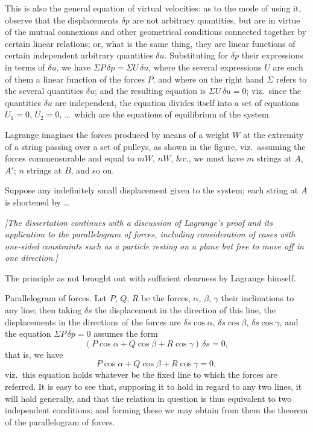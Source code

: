 \documentclass[11pt,a4paper]{book}
\begin{document}
This is also the general equation of virtual velocities: as to the mode of using it, observe that the displacements $\delta p$ are not arbitrary quantities, but are in virtue of the mutual connexions and other geometrical conditions connected together by certain linear relations; or, what is the same thing, they are linear functions of certain independent arbitrary quantities $\delta u$. Substituting for $\delta p$ their expressions in terms of $\delta u$, we have $\Sigma P\,\delta p = \Sigma U\,\delta u$, where the several expressions $U$ are each of them a linear function of the forces $P$, and where on the right hand $\Sigma$ refers to the several quantities $\delta u$; and the resulting equation is $\Sigma U\,\delta u = 0$; viz.\ since the quantities $\delta u$ are independent, the equation divides itself into a set of equations $U_1 = 0$, $U_2 = 0$, \ldots\ which are the equations of equilibrium of the system.

Lagrange imagines the forces produced by means of a weight $W$ at the extremity of a string passing over a set of pulleys, as shown in the figure, viz.\ assuming the forces commensurable and equal to $mW$, $nW$, \&c., we must have $m$ strings at $A$, $A'$; $n$ strings at $B$, and so on.

Suppose any indefinitely small displacement given to the system; each string at $A$ is shortened by \ldots

\smallskip

\textit{[The dissertation continues with a discussion of Lagrange's proof and its application to the parallelogram of forces, including consideration of cases with one-sided constraints such as a particle resting on a plane but free to move off in one direction.]}

\smallskip

The principle as not brought out with sufficient clearness by Lagrange himself.

\smallskip

Parallelogram of forces. Let $P$, $Q$, $R$ be the forces, $\alpha$, $\beta$, $\gamma$ their inclinations to any line; then taking $\delta s$ the displacement in the direction of this line, the displacements in the directions of the forces are $\delta s \cos \alpha$, $\delta s \cos \beta$, $\delta s \cos \gamma$, and the equation $\Sigma P\,\delta p = 0$ assumes the form
\[
(P \cos \alpha + Q \cos \beta + R \cos \gamma)\, \delta s = 0,
\]
that is, we have
\[
P \cos \alpha + Q \cos \beta + R \cos \gamma = 0,
\]
viz.\ this equation holds whatever be the fixed line to which the forces are referred. It is easy to see that, supposing it to hold in regard to any two lines, it will hold generally, and that the relation in question is thus equivalent to two independent conditions; and forming these we may obtain from them the theorem of the parallelogram of forces.
\end{document}
